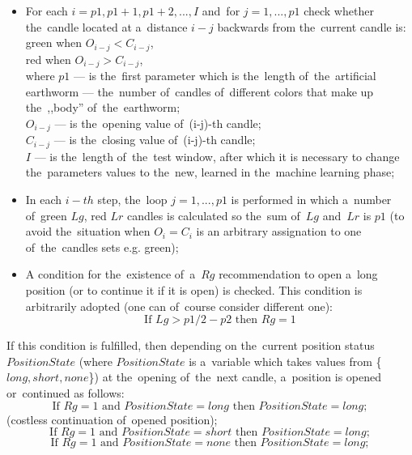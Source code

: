 \documentclass[runningheads,a4paper]{llncs}
\begin{document}
\begin{itemize}
\item For each $i = p1, p1 +1, p1 +2, ..., I$ and~for $j = 1, ..., p1$ check whether the~candle located at a~distance $i-j$ backwards from the~current candle is:\\
green when $O_{i-j} <C_{i-j}$, \\
red when $O_{i-j}> C_{i-j}$, \\
where $p1$ --- is the~first parameter which is the~length of~the~artificial earthworm --- the~number of~candles of~different colors that make up the~,,body'' of~the~earthworm; \\
$O_{i-j}$ --- is the~opening value of~(i-j)-th candle;\\ 
$C_{i-j}$ --- is the~closing value of~(i-j)-th candle; \\
$I$ --- is the~length of~the~test window, after which it is necessary to change the~parameters values to the~new, learned in the~machine learning phase;\\
\item In each $i-th$ step, the~loop $j = 1, ..., p1$ is performed in which a~number of~green $Lg$, red $Lr$ candles is calculated so the~sum of~$Lg$ and~$Lr$ is $p1$ (to avoid the~situation when $O_i = C_i$ is an arbitrary assignation to one of~the~candles sets e.g. green);
\item A condition for the~existence of~a~$Rg$ recommendation to open a~long position (or to continue it if it is open) is checked. This condition is arbitrarily adopted (one can of~course consider different one): 
\begin{equation}
\text{If } Lg> p1/2-p2 \text{ then } Rg=1
\end{equation}  
                                                     
\end{itemize}
If this condition is fulfilled, then depending on the~current position status $PositionState$ (where $PositionState$ is a~variable which takes values from \{$long, short, none$\}) at the~opening of~the~next candle, a~position is opened or~continued as follows: 
\begin{equation}
\text{If } Rg=1 \text{ and~} PositionState =long \text{ then }PositionState =long;
\end{equation}
(costless continuation of~opened position);
\begin{equation}
\text{If } Rg=1 \text{ and~} PositionState = short \text{ then } PositionState=long;
\end{equation}
\begin{equation}
\text{If } Rg=1 \text{ and~} PositionState =none \text{ then } PositionState =long;
\end{equation}
\end{document}

